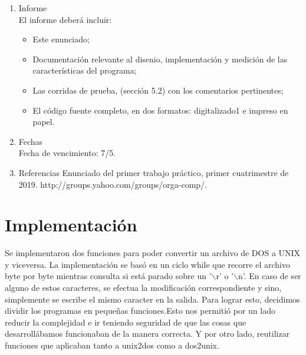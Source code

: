 \documentclass[a4paper,11pt]{article}
\begin{document}
\begin{enumerate}
\item Informe\\
El informe deber\'a incluir:
\begin{itemize}
\item Este enunciado;

\item Documentaci\'on relevante al disenio, implementaci\'on y medici\'on de las
caracter\'isticas del programa;

\item Las corridas de prueba, (secci\'on 5.2) con los comentarios pertinentes;

\item El c\'odigo fuente completo, en dos formatos: digitalizado1 e impreso en
papel. 
\end{itemize}

\item Fechas \\
Fecha de vencimiento: 7/5.

\item Referencias
Enunciado del primer trabajo pr\'actico, primer cuatrimestre de 2019.
http://groups.yahoo.com/groups/orga-comp/.

\end{enumerate}
\newpage

\section{Implementaci\'on}
Se implementaron dos funciones para poder convertir un archivo de DOS a UNIX y viceversa. La implementaci\'on se basó en un ciclo while que recorre el archivo byte por byte mientras consulta si está parado sobre un '$\backslash$r' o '$\backslash$n'. En caso de ser alguno de estos caracteres, se efectua la modificación correspondiente y sino, simplemente se escribe el mismo caracter en la salida.
Para lograr esto, decidimos dividir los programas en pequeñas funciones.Esto nos permiti\'o por un lado reducir la complejidad e ir teniendo seguridad de que las cosas que desarroll\'abamos funcionaban de la manera correcta. Y por otro lado, reutilizar funciones que aplicaban tanto a unix2dos como a dos2unix.
\end{document}
